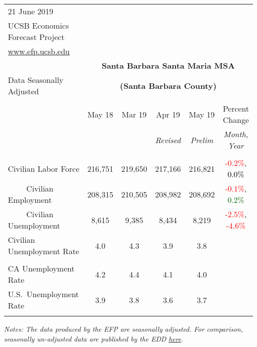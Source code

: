 \documentclass[12pt]{article}
\begin{document}
\begin{table}
\begin{tabular}{|l|c|c|c|c|c|}
\multicolumn{1}{l}{\small 21 June 2019} & \multicolumn{5}{c}{} \\
\multicolumn{1}{l}{\small UCSB Economics Forecast Project} & \multicolumn{5}{c}{} \\
\multicolumn{1}{l}{\small \href{http://www.efp.ucsb.edu/}{www.efp.ucsb.edu}} & \multicolumn{5}{c}{} \\
\multicolumn{1}{c}{} & \multicolumn{5}{c}{\large \textbf{Santa Barbara Santa Maria MSA}} \\
\multicolumn{1}{l}{\small Data Seasonally Adjusted} & \multicolumn{5}{c}{\small \textbf{(Santa Barbara County)}} \\ \hline \hline
& & & & & \\
 & May 18 & Mar 19 & Apr 19 & May 19 & Percent Change \\
 & & & \small \textit{Revised} & \small \textit{Prelim} & \small \textit{Month, Year} \\ \hline
& & & & & \\
Civilian Labor Force & 216,751 & 219,650 & 217,166 & 216,821 & \textcolor{red}{-0.2\%}, \textcolor{black}{0.0\%} \\
$\qquad$ \small Civilian Employment & 208,315 & 210,505 & 208,982 & 208,692 & \textcolor{red}{-0.1\%}, \textcolor{darkgreen}{0.2\%} \\
$\qquad$ \small Civilian Unemployment & 8,615 & 9,385 & 8,434 & 8,219 & \textcolor{red}{-2.5\%}, \textcolor{red}{-4.6\%} \\
Civilian Unemployment Rate & 4.0 & 4.3 & 3.9 & 3.8 & \\
& & & & & \\
CA Unemployment Rate & 4.2 & 4.4 & 4.1 & 4.0 & \\
U.S.\ Unemployment Rate & 3.9 & 3.8 & 3.6 & 3.7 & \\
& & & & & \\ \hline \hline
\end{tabular}
\par
\vspace{.5em}
\footnotesize
\textit{Notes: The data produced by the EFP are seasonally adjusted. For comparison, seasonally un-adjusted data are published by the EDD \href{http://www.labormarketinfo.ca.gov/file/lfmonth/satb$pds.pdf}{here}.}
\end{table}
\end{document}
